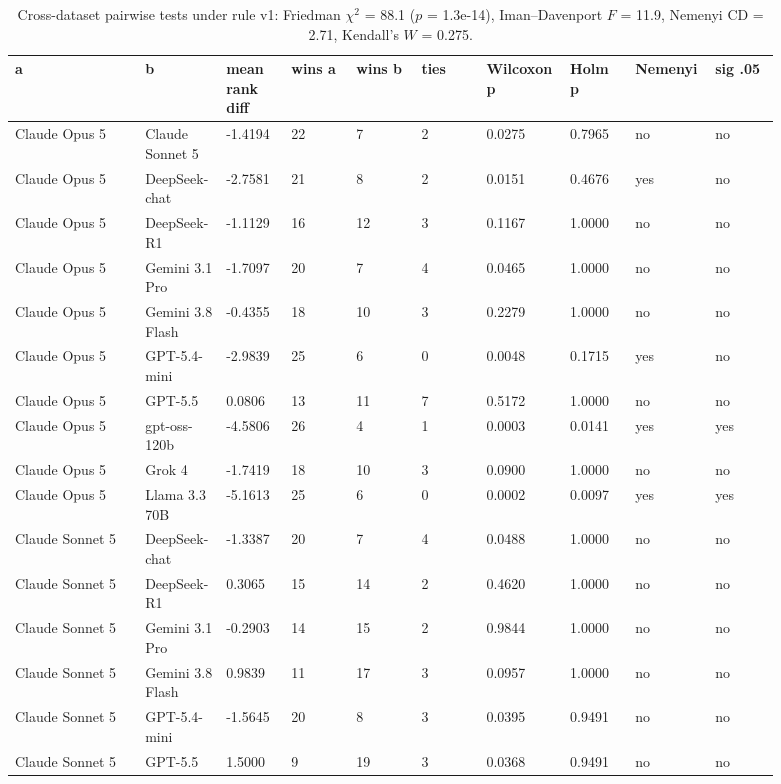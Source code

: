 \begin{landscape}
\tiny
\setlength{\tabcolsep}{3pt}
\begin{longtable}{p{0.162\linewidth}p{0.081\linewidth}p{0.081\linewidth}p{0.081\linewidth}p{0.081\linewidth}p{0.081\linewidth}p{0.081\linewidth}p{0.081\linewidth}p{0.081\linewidth}p{0.081\linewidth}}
\caption{Cross-dataset pairwise tests under rule v1: Friedman $\chi^2$ = 88.1 ($p$ = 1.3e-14), Iman--Davenport $F$ = 11.9, Nemenyi CD = 2.71, Kendall's $W$ = 0.275.}\label{tab:pairwise_v1_original}\\
\toprule
a & b & mean rank diff & wins a & wins b & ties & Wilcoxon p & Holm p & Nemenyi & sig .05 \\
\midrule
Claude Opus 5 & Claude Sonnet 5 & -1.4194 & 22 & 7 & 2 & 0.0275 & 0.7965 & no & no \\
Claude Opus 5 & DeepSeek-chat & -2.7581 & 21 & 8 & 2 & 0.0151 & 0.4676 & yes & no \\
Claude Opus 5 & DeepSeek-R1 & -1.1129 & 16 & 12 & 3 & 0.1167 & 1.0000 & no & no \\
Claude Opus 5 & Gemini 3.1 Pro & -1.7097 & 20 & 7 & 4 & 0.0465 & 1.0000 & no & no \\
Claude Opus 5 & Gemini 3.8 Flash & -0.4355 & 18 & 10 & 3 & 0.2279 & 1.0000 & no & no \\
Claude Opus 5 & GPT-5.4-mini & -2.9839 & 25 & 6 & 0 & 0.0048 & 0.1715 & yes & no \\
Claude Opus 5 & GPT-5.5 & 0.0806 & 13 & 11 & 7 & 0.5172 & 1.0000 & no & no \\
Claude Opus 5 & gpt-oss-120b & -4.5806 & 26 & 4 & 1 & 0.0003 & 0.0141 & yes & yes \\
Claude Opus 5 & Grok 4 & -1.7419 & 18 & 10 & 3 & 0.0900 & 1.0000 & no & no \\
Claude Opus 5 & Llama 3.3 70B & -5.1613 & 25 & 6 & 0 & 0.0002 & 0.0097 & yes & yes \\
Claude Sonnet 5 & DeepSeek-chat & -1.3387 & 20 & 7 & 4 & 0.0488 & 1.0000 & no & no \\
Claude Sonnet 5 & DeepSeek-R1 & 0.3065 & 15 & 14 & 2 & 0.4620 & 1.0000 & no & no \\
Claude Sonnet 5 & Gemini 3.1 Pro & -0.2903 & 14 & 15 & 2 & 0.9844 & 1.0000 & no & no \\
Claude Sonnet 5 & Gemini 3.8 Flash & 0.9839 & 11 & 17 & 3 & 0.0957 & 1.0000 & no & no \\
Claude Sonnet 5 & GPT-5.4-mini & -1.5645 & 20 & 8 & 3 & 0.0395 & 0.9491 & no & no \\
Claude Sonnet 5 & GPT-5.5 & 1.5000 & 9 & 19 & 3 & 0.0368 & 0.9491 & no & no \\

\end{longtable}
\end{landscape}
